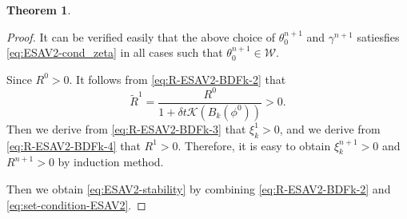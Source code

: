 \documentclass[final,review,onefignum,onetabnum]{siamart190516}
\theoremstyle{plain}
\newtheorem{thm}{Theorem}[section]
\begin{document}
\begin{thm}

\end{thm}

\begin{proof}
	It can be verified easily that the above choice of $\theta_{0}^{n+1}$ and $\gamma^{n+1}$ satiesfies \eqref{eq:ESAV2-cond_zeta} in all cases such that $\theta_0^{n+1}\in \mathcal{W}$.
	
Since $R^{0} > 0$. 
It follows from \eqref{eq:R-ESAV2-BDFk-2} that 
\begin{equation}\label{tilder}
	\tilde{R}^{1}=\frac{R^{0}}{1+\delta t \mathcal{K}\left(B_{k}(\phi^{0})\right)} > 0.
\end{equation}
Then we derive from \eqref{eq:R-ESAV2-BDFk-3} that $\xi_{k}^{1}> 0$, and we  derive from \eqref{eq:R-ESAV2-BDFk-4} that $R^{1} > 0$. 
Therefore, it is easy to obtain $\xi_{k}^{n+1}> 0$ and  $R^{n+1} > 0$ by induction method.

Then we obtain \eqref{eq:ESAV2-stability} by combining \eqref{eq:R-ESAV2-BDFk-2} and \eqref{eq:set-condition-ESAV2}. 


\end{proof}
\end{document}

